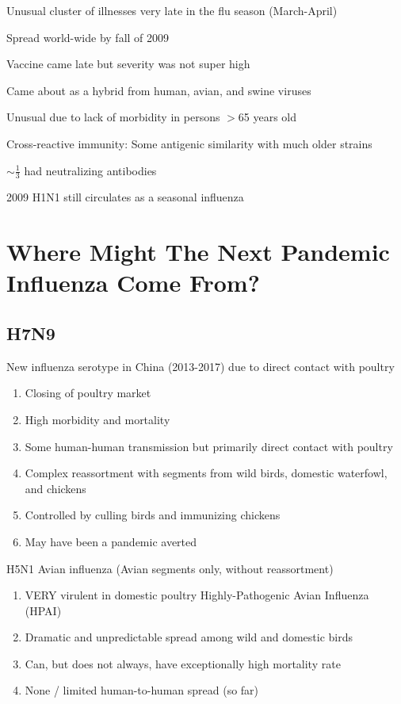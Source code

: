 \documentclass{notes}
\begin{document}
Unusual cluster of illnesses very late in the flu season (March-April)

Spread world-wide by fall of 2009

\tab Vaccine came late but severity was not super high

Came about as a hybrid from human, avian, and swine viruses

Unusual due to lack of morbidity in persons \(>\)65 years old

\tab Cross-reactive immunity: Some antigenic similarity with much older strains

\tab \(\sim\frac{1}{3}\) had neutralizing antibodies

2009 H1N1 still circulates as a seasonal influenza

\section{Where Might The Next Pandemic Influenza Come From?}


\subsection{H7N9}

New influenza serotype in China (2013-2017) due to direct contact with poultry

\begin{enumerate}
    \item Closing of poultry market
    \item High morbidity and mortality
    \item Some human-human transmission but primarily direct contact with poultry
    \item Complex reassortment with segments from wild birds, domestic waterfowl, and chickens
    \item Controlled by culling birds and immunizing chickens
    \item May have been a pandemic averted
\end{enumerate}

H5N1 Avian influenza (Avian segments only, without reassortment)

\begin{enumerate}
    \item VERY virulent in domestic poultry
    \subitem Highly-Pathogenic Avian Influenza (HPAI)
    \item Dramatic and unpredictable spread among wild and domestic birds
    \item Can, but does not always, have exceptionally high mortality rate
    \item None / limited human-to-human spread (so far)
\end{enumerate}
\end{document}
